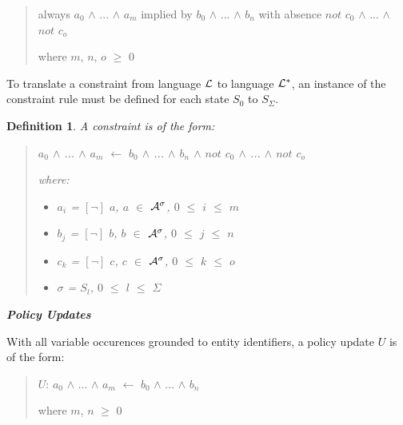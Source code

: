 \documentclass[10pt, twocolumn]{article}
\newtheorem{definition}{Definition}
\begin{document}
          \begin{quote}
            always $a_{0}$ $\land$ ... $\land$ $a_{m}$
            implied by $b_{0}$ $\land$ ... $\land$ $b_{n}$
            with absence $not$ $c_{0}$ $\land$ ... $\land$ $not$ $c_{o}$

            where $m$, $n$, $o$ $\geq$ $0$
          \end{quote}

          To translate a constraint from language ${\cal L}$ to language
          ${\cal L}^{*}$, an instance of the constraint rule must be defined
          for each state $S_{0}$ to $S_{\Sigma}$.

          \begin{definition}
            A constraint is of the form:

            \begin{quote}
              $a_{0}$ $\land$ ... $\land$ $a_{m}$ $\leftarrow$ $b_{0}$ $\land$ ... $\land$ $b_{n}$ $\land$ $not$ $c_{0}$ $\land$ ... $\land$ $not$ $c_{o}$

              where:

              \begin{itemize}
                \item
                  $a_{i}$ = $[\lnot]$ $a$, $a$ $\in$ ${\cal A}^{\sigma}$, $0$ $\leq$ $i$ $\leq$ $m$
                \item
                  $b_{j}$ = $[\lnot]$ $b$, $b$ $\in$ ${\cal A}^{\sigma}$, $0$ $\leq$ $j$ $\leq$ $n$
                \item
                  $c_{k}$ = $[\lnot]$ $c$, $c$ $\in$ ${\cal A}^{\sigma}$, $0$ $\leq$ $k$ $\leq$ $o$
                \item
                  $\sigma$ = $S_{l}$, $0$ $\leq$ $l$ $\leq$ $\Sigma$
              \end{itemize}

            \end{quote}

          \end{definition}

        \noindent \textbf{\emph{Policy Updates}}

          With all variable occurences grounded to entity identifiers, a
          policy update $U$ is of the form:

          \begin{quote}
            $U$: $a_{0}$ $\land$ ... $\land$ $a_{m}$ $\leftarrow$ $b_{0}$ $\land$ ... $\land$ $b_{n}$

            where $m$, $n$ $\geq$ $0$
          \end{quote}
\end{document}
